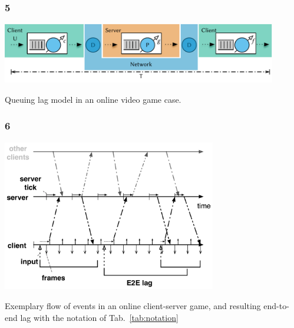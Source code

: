 \documentclass{UDEbeamerEN}
\begin{document}
\begin{frame}
	\frametitle{5}

	\begin{center}
		\includegraphics[width=0.9\textwidth]{../../../models/e2e-lag-model.pdf}

		Queuing lag model in an online video game case.
	\end{center}

\end{frame}


\begin{frame}
	\frametitle{6}

	\begin{center}
		\includegraphics[width=0.7\textwidth]{../../../models/tickrate-timeseries-poster.pdf}

		Exemplary flow of events in an online client-server game, and resulting end-to-end lag with the notation of Tab.~\ref{tab:notation}
	\end{center}

\end{frame}
\end{document}
